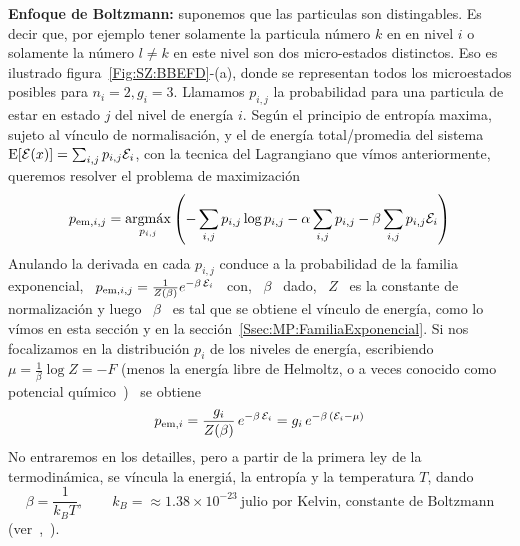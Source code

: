 {\begin{ejemplo}
  {\bf Enfoque de Boltzmann:} suponemos  que las particulas son distingables. Es
  decir que, por  ejemplo tener solamente la particula n\'umero  $k$ en en nivel
  $i$  o solamente  la n\'umero  $l\ne k$  en este  nivel son  dos micro-estados
  distinctos.   Eso  es   ilustrado   figura~\ref{Fig:SZ:BBEFD}-(a),  donde   se
  representan todos los microestados posibles para $n_i = 2, g_i = 3$.  Llamamos
  $p_{i,j}$ la probabilidad para una particula  de estar en estado $j$ del nivel
  de  energ\'ia $i$.   Seg\'un  el  principio de  entrop\'ia  maxima, sujeto  al
  v\'inculo de  normalisaci\'on, y  el de  energ\'ia total/promedia  del sistema
  $\operatorname{E}[\mathcal{E}(x)] =  \sum_{i,j} p_{i,j}  \mathcal{E}_i$, con la  tecnica del  Lagrangiano que
  v\'imos anteriormente, queremos resolver el problema de maximizaci\'on
  \[  
  p_{\mathrm{em},i,j}  =  \operatorname*{argm\acute{a}x}_{p_{i,j}}  \left( -  \sum_{i,j}  p_{i,j}  \log
    p_{i,j}    -    \alpha    \sum_{i,j}     p_{i,j}    -    \beta    \sum_{i,j}
    p_{i,j} \mathcal{E}_i \right) \]
  Anulando la derivada en cada $p_{i,j}$ conduce a la probabilidad de la familia
  exponencial, \ $p_{\mathrm{em},i,j} = \frac{1}{Z(\beta)} e^{-\beta \, \mathcal{E}_i}$ \
  con, \ $\beta$  \ dado, \ $Z$ \  es la constante de normalizaci\'on  y luego \
  $\beta$ \ es tal que se obtiene  el v\'inculo de energ\'ia, como lo v\'imos en
  esta  secci\'on y  en la  secci\'on~\ref{Ssec:MP:FamiliaExponencial}.  Si  nos
  focalizamos  en  la   distribuci\'on  $p_i$  de  los   niveles  de  energ\'ia,
  escribiendo \ $\mu =  \frac{1}{\beta} \log Z = - F$  (menos la energ\'ia libre
  de  Helmoltz,  o a  veces  conocido  como potencial  qu\'imico~\cite{LanLif80,
  Mer18}) \ se obtiene
  \[  
  p_{\mathrm{em},i}  =  \frac{g_i}{Z(\beta)} \,  e^{-\beta  \,  \mathcal{E}_i} =  g_i  \,
    e^{-\beta \, (\mathcal{E}_i - \mu)} \]
  No  entraremos en  los  detailles,  pero a  partir  de la  primera  ley de  la
  termodin\'amica,  se v\'incula la  energi\'a, la  entrop\'ia y  la temperatura
  $T$, dando
  \[
  \beta  =  \frac{1}{k_B  T}, \qquad  k_B  =  \approx  1.38 \times  10^{-23}  \:
  \mbox{julio por Kelvin, constante de Boltzmann}
  \]
  (ver~\cite{Jay57},~\cite[Cap.~IV]{LanLif80}).


\end{ejemplo}}
